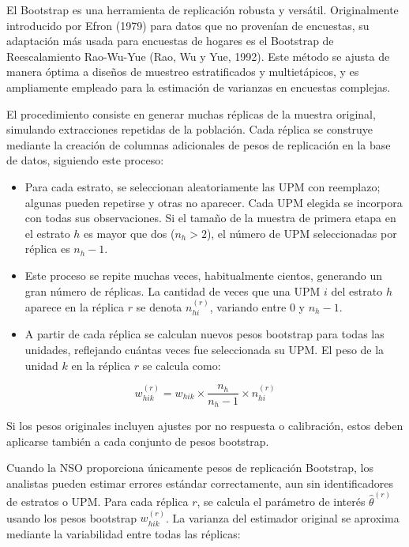 \documentclass[
  spanish,
  12pt,
]{book}
\providecommand{\tightlist}{%
  \setlength{\itemsep}{0pt}\setlength{\parskip}{0pt}}
\begin{document}
El Bootstrap es una herramienta de replicación robusta y versátil. Originalmente introducido por Efron (1979) para datos que no provenían de encuestas, su adaptación más usada para encuestas de hogares es el Bootstrap de Reescalamiento Rao-Wu-Yue (Rao, Wu y Yue, 1992). Este método se ajusta de manera óptima a diseños de muestreo estratificados y multietápicos, y es ampliamente empleado para la estimación de varianzas en encuestas complejas.

El procedimiento consiste en generar muchas réplicas de la muestra original, simulando extracciones repetidas de la población. Cada réplica se construye mediante la creación de columnas adicionales de pesos de replicación en la base de datos, siguiendo este proceso:

\begin{itemize}
\tightlist
\item
  Para cada estrato, se seleccionan aleatoriamente las UPM con reemplazo; algunas pueden repetirse y otras no aparecer. Cada UPM elegida se incorpora con todas sus observaciones. Si el tamaño de la muestra de primera etapa en el estrato \(h\) es mayor que dos (\(n_h > 2\)), el número de UPM seleccionadas por réplica es \(n_h - 1\).
\item
  Este proceso se repite muchas veces, habitualmente cientos, generando un gran número de réplicas. La cantidad de veces que una UPM \(i\) del estrato \(h\) aparece en la réplica \(r\) se denota \(n_{hi}^{(r)}\), variando entre 0 y \(n_h - 1\).
\item
  A partir de cada réplica se calculan nuevos pesos bootstrap para todas las unidades, reflejando cuántas veces fue seleccionada su UPM. El peso de la unidad \(k\) en la réplica \(r\) se calcula como:
\end{itemize}

\[
w_{hik}^{(r)} = w_{hik} \times \frac{n_h}{n_h - 1} \times n_{hi}^{(r)}
\]

Si los pesos originales incluyen ajustes por no respuesta o calibración, estos deben aplicarse también a cada conjunto de pesos bootstrap.

Cuando la NSO proporciona únicamente pesos de replicación Bootstrap, los analistas pueden estimar errores estándar correctamente, aun sin identificadores de estratos o UPM. Para cada réplica \(r\), se calcula el parámetro de interés \(\hat{\theta}^{(r)}\) usando los pesos bootstrap \(w_{hik}^{(r)}\). La varianza del estimador original se aproxima mediante la variabilidad entre todas las réplicas:
\end{document}
